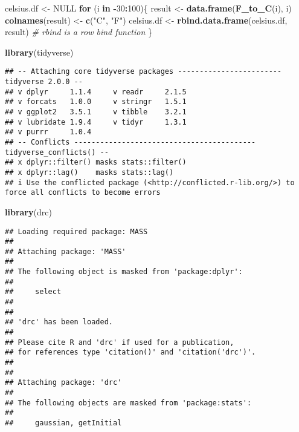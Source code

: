 \documentclass[
]{article}
\newenvironment{Shaded}{\begin{snugshade}}{\end{snugshade}}
\newcommand{\CommentTok}[1]{\textcolor[rgb]{0.56,0.35,0.01}{\textit{#1}}}
\newcommand{\ConstantTok}[1]{\textcolor[rgb]{0.56,0.35,0.01}{#1}}
\newcommand{\ControlFlowTok}[1]{\textcolor[rgb]{0.13,0.29,0.53}{\textbf{#1}}}
\newcommand{\DecValTok}[1]{\textcolor[rgb]{0.00,0.00,0.81}{#1}}
\newcommand{\FunctionTok}[1]{\textcolor[rgb]{0.13,0.29,0.53}{\textbf{#1}}}
\newcommand{\NormalTok}[1]{#1}
\newcommand{\OtherTok}[1]{\textcolor[rgb]{0.56,0.35,0.01}{#1}}
\newcommand{\SpecialCharTok}[1]{\textcolor[rgb]{0.81,0.36,0.00}{\textbf{#1}}}
\newcommand{\StringTok}[1]{\textcolor[rgb]{0.31,0.60,0.02}{#1}}
\begin{document}
\begin{Shaded}
\begin{Highlighting}[]
\NormalTok{celsius.df }\OtherTok{\textless{}{-}} \ConstantTok{NULL}
\ControlFlowTok{for}\NormalTok{ (i }\ControlFlowTok{in} \SpecialCharTok{{-}}\DecValTok{30}\SpecialCharTok{:}\DecValTok{100}\NormalTok{)\{}
\NormalTok{  result }\OtherTok{\textless{}{-}} \FunctionTok{data.frame}\NormalTok{(}\FunctionTok{F\_to\_C}\NormalTok{(i), i)}
  \FunctionTok{colnames}\NormalTok{(result) }\OtherTok{\textless{}{-}} \FunctionTok{c}\NormalTok{(}\StringTok{"C"}\NormalTok{, }\StringTok{"F"}\NormalTok{)}
\NormalTok{  celsius.df }\OtherTok{\textless{}{-}} \FunctionTok{rbind.data.frame}\NormalTok{(celsius.df, result) }\CommentTok{\# rbind is a row bind function}
\NormalTok{\}}
\end{Highlighting}
\end{Shaded}

\begin{Shaded}
\begin{Highlighting}[]
\FunctionTok{library}\NormalTok{(tidyverse)}
\end{Highlighting}
\end{Shaded}

\begin{verbatim}
## -- Attaching core tidyverse packages ------------------------ tidyverse 2.0.0 --
## v dplyr     1.1.4     v readr     2.1.5
## v forcats   1.0.0     v stringr   1.5.1
## v ggplot2   3.5.1     v tibble    3.2.1
## v lubridate 1.9.4     v tidyr     1.3.1
## v purrr     1.0.4     
## -- Conflicts ------------------------------------------ tidyverse_conflicts() --
## x dplyr::filter() masks stats::filter()
## x dplyr::lag()    masks stats::lag()
## i Use the conflicted package (<http://conflicted.r-lib.org/>) to force all conflicts to become errors
\end{verbatim}

\begin{Shaded}
\begin{Highlighting}[]
\FunctionTok{library}\NormalTok{(drc)}
\end{Highlighting}
\end{Shaded}

\begin{verbatim}
## Loading required package: MASS
## 
## Attaching package: 'MASS'
## 
## The following object is masked from 'package:dplyr':
## 
##     select
## 
## 
## 'drc' has been loaded.
## 
## Please cite R and 'drc' if used for a publication,
## for references type 'citation()' and 'citation('drc')'.
## 
## 
## Attaching package: 'drc'
## 
## The following objects are masked from 'package:stats':
## 
##     gaussian, getInitial
\end{verbatim}
\end{document}
